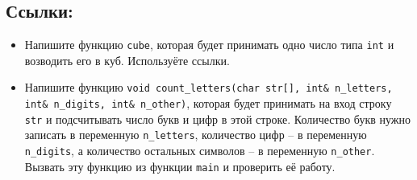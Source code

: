 \documentclass{article}
\begin{document}
\subsection*{Ссылки:}
\begin{itemize}
\item Напишите функцию \texttt{cube}, которая будет принимать одно число типа \texttt{int} и возводить его в куб. Используёте ссылки.
\item Напишите функцию \texttt{void count\_letters(char str[], int\& n\_letters, int\& n\_digits, int\& n\_other)}, которая будет принимать на вход строку \texttt{str} и подсчитывать число букв и цифр в этой строке. Количество букв нужно записать в переменную \texttt{n\_letters}, количество цифр -- в переменную \texttt{n\_digits}, а количество остальных символов -- в переменную \texttt{n\_other}. Вызвать эту функцию из функции \texttt{main} и проверить её работу.
\end{itemize}
\end{document}
